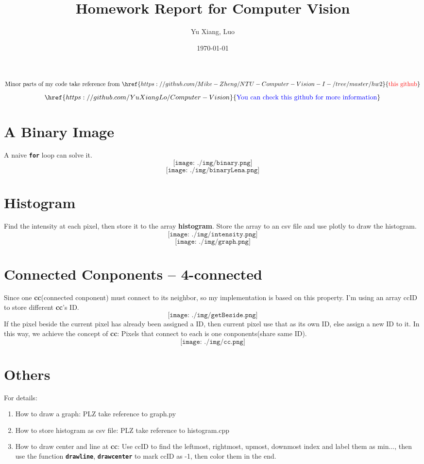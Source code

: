 \documentclass[12pt,a4paper]{article}
\title{Homework Report for Computer Vision}
\author{Yu Xiang, Luo}
\date{\today}
\begin{document}
\maketitle

\[
	\text{Minor parts of my code take reference from }\href{https://github.com/Mike-Zheng/NTU-Computer-Vision-I-/tree/master/hw2}{\text{\textcolor{red}{this github}}}
\]
\[
	\href{https://github.com/YuXiangLo/Computer-Vision}{\text{\textcolor{blue}{You can check this github for more information}}}
\]

\section*{A Binary Image}
A naive \textbf{\texttt{for}} loop can solve it.
\[
	\texttt{[image: ./img/binary.png]}
\]
\[
	\texttt{[image: ./img/binaryLena.png]}
\]

\newpage
\section*{Histogram}
Find the intensity at each pixel, then store it to the array \textbf{histogram}. Store the array to an csv file and use plotly to draw the histogram.
\[
	\texttt{[image: ./img/intensity.png]}
\]
\[
	\texttt{[image: ./img/graph.png]}
\]

\newpage
\section*{Connected Conponents – 4-connected}
Since one \textbf{cc}(connected conponent) must connect to its neighbor, so my implementation is based on this property. I'm using an array ccID to store different \textbf{cc}'s ID.
\[
	\texttt{[image: ./img/getBeside.png]}
\]
If the pixel beside the current pixel has already been assigned a ID, then current pixel use that as its own ID, else assign a new ID to it. In this way, we achieve the concept of \textbf{cc}: Pixels that connect to each is one conponents(share same ID).  
\[
	\texttt{[image: ./img/cc.png]}
\]

\section*{Others}
For details:
\begin{enumerate}
	\item How to draw a graph: PLZ take reference to graph.py
	\item How to store histogram as csv file: PLZ take reference to histogram.cpp
	\item How to draw center and line at \textbf{cc}: Use ccID to find the leftmost, rightmost, upmost, downmost index and label them as min..., then use the function \textbf{\texttt{drawline}}, \textbf{\texttt{drawcenter}} to mark ccID as -1, then color them in the end. 
\end{enumerate}
\end{document}
